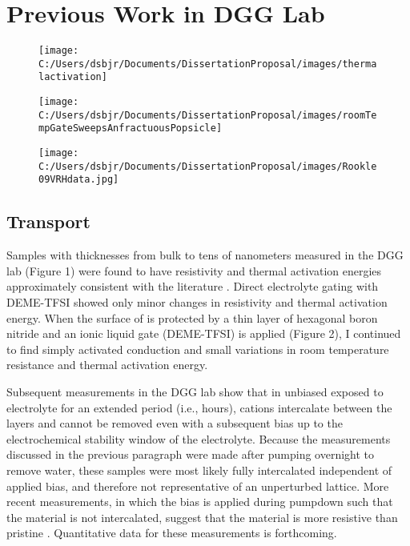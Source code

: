 \documentclass[11pt]{article}
\begin{document}
\section{Previous Work in DGG Lab}

\begin{figure}
\centering
\begin{minipage}{0.3\textwidth}
\centering 
  {\texttt{[image: C:/Users/dsbjr/Documents/DissertationProposal/images/thermalactivation]}\label{fig:f2}}
  \captionsetup{width=0.9\textwidth}
\end{minipage}%
\begin{minipage}{0.3\textwidth}
\centering
  {\texttt{[image: C:/Users/dsbjr/Documents/DissertationProposal/images/roomTempGateSweepsAnfractuousPopsicle]}\label{fig:f1}}
  \captionsetup{width=0.9\textwidth}
\end{minipage}%
\begin{minipage}{0.3\textwidth}
\centering
	{\texttt{[image: C:/Users/dsbjr/Documents/DissertationProposal/images/Rookle09VRHdata.jpg]}\label{fig:f3}}
	\captionsetup{width=0.9\textwidth}
\end{minipage}
\end{figure}

\subsection{Transport}

Samples with thicknesses from bulk to tens of nanometers measured in the DGG lab (Figure 1) were found to have resistivity and thermal activation energies approximately consistent with the literature \cite{Rojas1983}. Direct electrolyte gating with DEME-TFSI showed only minor changes in resistivity and thermal activation energy. When the surface of \rucl is protected by a thin layer of hexagonal boron nitride and an ionic liquid gate (DEME-TFSI) is applied (Figure 2), I continued to find simply activated conduction and small variations in room temperature resistance and thermal activation energy.

Subsequent measurements in the DGG lab show that in unbiased \rucl exposed to electrolyte for an extended period (i.e., hours), cations intercalate between the layers and cannot be removed even with a subsequent bias up to the electrochemical stability window of the electrolyte. Because the measurements discussed in the previous paragraph were made after pumping overnight to remove water, these samples were most likely fully intercalated independent of applied bias, and therefore not representative of an unperturbed lattice. More recent measurements, in which the bias is applied during pumpdown such that the material is not intercalated, suggest that the material is more resistive than pristine \ruclnospace. Quantitative data for these measurements is forthcoming.
\end{document}
